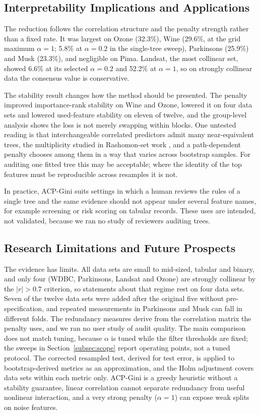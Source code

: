 \documentclass[pdflatex,sn-basic,Numbered]{sn-jnl}
\begin{document}
\subsection{Interpretability Implications and Applications}
The reduction follows the correlation structure and the penalty strength rather than a fixed rate. It was largest on Ozone (32.3\%), Wine (29.6\%, at the grid maximum $\alpha=1$; 5.8\% at $\alpha=0.2$ in the single-tree sweep), Parkinsons (25.9\%) and Musk (23.3\%), and negligible on Pima. Landsat, the most collinear set, showed 6.6\% at its selected $\alpha=0.2$ and 52.2\% at $\alpha=1$, so on strongly collinear data the consensus value is conservative.

The stability result changes how the method should be presented. The penalty improved importance-rank stability on Wine and Ozone, lowered it on four data sets and lowered used-feature stability on eleven of twelve, and the group-level analysis shows the loss is not merely swapping within blocks. One untested reading is that interchangeable correlated predictors admit many near-equivalent trees, the multiplicity studied in Rashomon-set work \cite{arslan2025sorted,hsu2025rashomon}, and a path-dependent penalty chooses among them in a way that varies across bootstrap samples. For auditing one fitted tree this may be acceptable; where the identity of the top features must be reproducible across resamples it is not.

In practice, ACP-Gini suits settings in which a human reviews the rules of a single tree and the same evidence should not appear under several feature names, for example screening or risk scoring on tabular records. These uses are intended, not validated, because we ran no study of reviewers auditing trees.

\subsection{Research Limitations and Future Prospects}\label{subsec:limits}
The evidence has limits. All data sets are small to mid-sized, tabular and binary, and only four (WDBC, Parkinsons, Landsat and Ozone) are strongly collinear by the $|r|>0.7$ criterion, so statements about that regime rest on four data sets. Seven of the twelve data sets were added after the original five without pre-specification, and repeated measurements in Parkinsons and Musk can fall in different folds. The redundancy measures derive from the correlation matrix the penalty uses, and we ran no user study of audit quality. The main comparison does not match tuning, because $\alpha$ is tuned while the filter thresholds are fixed; the sweeps in Section~\ref{subsec:scope} report operating points, not a tuned protocol. The corrected resampled test, derived for test error, is applied to bootstrap-derived metrics as an approximation, and the Holm adjustment covers data sets within each metric only. ACP-Gini is a greedy heuristic without a stability guarantee, linear correlation cannot separate redundancy from useful nonlinear interaction, and a very strong penalty ($\alpha=1$) can expose weak splits on noise features.
\end{document}
